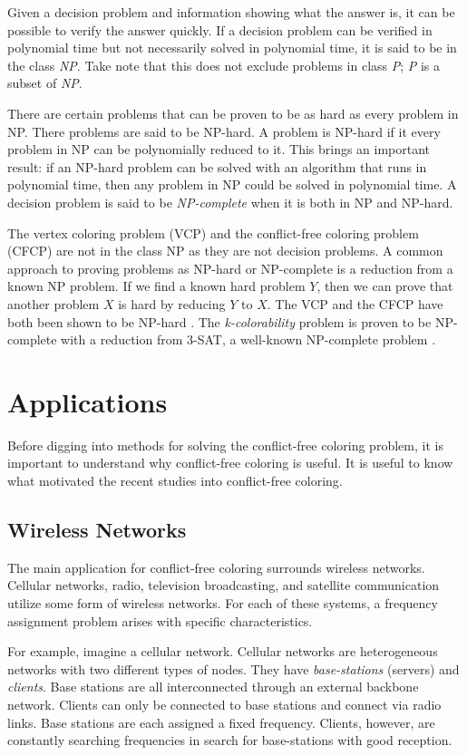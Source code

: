 \documentclass{sig-alternate}
\begin{document}
Given a decision problem and information showing what the answer is, it can be possible to verify the answer quickly. If a decision problem can be verified in polynomial time but not necessarily solved in polynomial time, it is said to be in the class \emph{NP}. Take note that this does not exclude problems in class \emph{P}; \emph{P} is a subset of \emph{NP}.

There are certain problems that can be proven to be as hard as every problem in NP. There problems are said to be NP-hard. A problem is NP-hard if it every problem in NP can be polynomially reduced to it. This brings an important result: if an NP-hard problem can be solved with an algorithm that runs in polynomial time, then any problem in NP could be solved in polynomial time. A decision problem is said to be \emph{NP-complete} when it is both in NP and NP-hard.

The vertex coloring problem (VCP) and the conflict-free coloring problem (CFCP) are not in the class NP as they are not decision problems. A common approach to proving problems as NP-hard or NP-complete is a reduction from a known NP problem. If we find a known hard problem $Y$, then we can prove that another problem $X$ is hard by reducing $Y$ to $X$. The VCP and the CFCP have both been shown to be NP-hard \cite{abel2017three,moret1998theory}. The \emph{k-colorability} problem is proven to be NP-complete with a reduction from 3-SAT, a well-known NP-complete problem \cite{sharma2012new}.

\section{Applications}
Before digging into methods for solving the conflict-free coloring problem, it is important to understand why conflict-free coloring is useful. It is useful to know what motivated the recent studies into conflict-free coloring.

\subsection{Wireless Networks}
The main application for conflict-free coloring surrounds wireless networks. Cellular networks, radio, television broadcasting, and satellite communication utilize some form of wireless networks. For each of these systems, a frequency assignment problem arises with specific characteristics.

For example, imagine a cellular network. Cellular networks are heterogeneous networks with two different types of nodes. They have \emph{base-stations} (servers) and \emph{clients}. Base stations are all interconnected through an external backbone network. Clients can only be connected to base stations and connect via radio links. Base stations are each assigned a fixed frequency. Clients, however, are constantly searching frequencies in search for base-stations with good reception.
\end{document}
